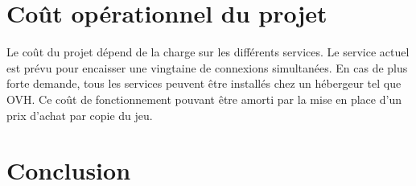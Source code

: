 \documentclass[a4paper,11pt]{article}
\begin{document}
\section{Coût opérationnel du projet}

Le coût du projet dépend de la charge sur les différents services.
Le service actuel est prévu pour encaisser une vingtaine de connexions simultanées.
En cas de plus forte demande, tous les services peuvent être installés chez un hébergeur tel que OVH. 
Ce coût de fonctionnement pouvant être amorti par la mise en place d’un prix d’achat par copie du jeu.


\section{Conclusion}
\end{document}
